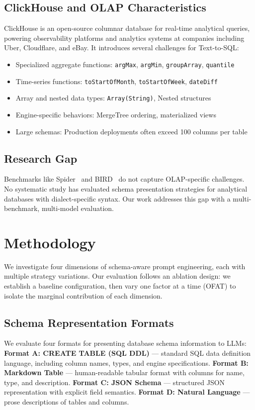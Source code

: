 \documentclass[sigconf, nonacm]{acmart}
\begin{document}
\subsection{ClickHouse and OLAP Characteristics}
ClickHouse is an open-source columnar database for real-time analytical queries, powering observability platforms and analytics systems at companies including Uber, Cloudflare, and eBay. It introduces several challenges for Text-to-SQL:
\begin{itemize}
    \item Specialized aggregate functions: \texttt{argMax}, \texttt{argMin}, \texttt{group\-Array}, \texttt{quantile}
    \item Time-series functions: \texttt{toStartOfMonth}, \texttt{toStartOfWeek}, \texttt{dateDiff}
    \item Array and nested data types: \texttt{Array(String)}, Nested struc\-tures
    \item Engine-specific behaviors: MergeTree ordering, materialized views
    \item Large schemas: Production deployments often exceed 100 columns per table
\end{itemize}

\subsection{Research Gap}
Benchmarks like Spider~\cite{yu2018spider} and BIRD~\cite{li2024bird} do not capture OLAP-specific challenges. No systematic study has evaluated schema presentation strategies for analytical databases with dialect-specific syntax. Our work addresses this gap with a multi-benchmark, multi-model evaluation.

\section{Methodology}
\label{sec:methodology}

We investigate four dimensions of schema-aware prompt engineering, each with multiple strategy variations. Our evaluation follows an ablation design: we establish a baseline configuration, then vary one factor at a time (OFAT) to isolate the marginal contribution of each dimension.

\subsection{Schema Representation Formats}
We evaluate four formats for presenting database schema information to LLMs:
\textbf{Format A: CREATE TABLE (SQL DDL)} --- standard SQL data definition language, including column names, types, and engine specifications.
\textbf{Format B: Markdown Table} --- human-readable tabular format with columns for name, type, and description.
\textbf{Format C: JSON Schema} --- structured JSON representation with explicit field semantics.
\textbf{Format D: Natural Language} --- prose descriptions of tables and columns.
\end{document}

